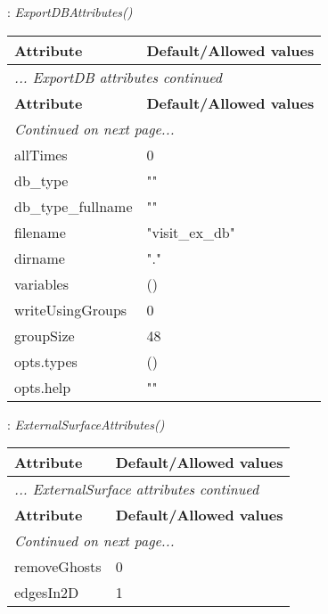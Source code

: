 \documentclass[10pt,a4paper]{report}
\begin{document}
\newpage

{}
: {\it ExportDBAttributes() }\\[-3mm]

\begin{longtable}{ll}
{\bf Attribute} & {\bf Default/Allowed values} \\
\hline \hline
\endfirsthead
\multicolumn{2}{l}{{\it ... ExportDB attributes continued}} \\
{\bf Attribute} & {\bf Default/Allowed values} \\
\hline \hline
\endhead
\hline
\multicolumn{2}{l}{{\it Continued on next page...}} \\
\endfoot
\hline
\endlastfoot

allTimes  &  0 \\
db\_type  &  "" \\
db\_type\_fullname  &  "" \\
filename  &  "visit\_ex\_db" \\
dirname  &  "." \\
variables  &  () \\
writeUsingGroups  &  0 \\
groupSize  &  48 \\
opts.types  &  () \\
opts.help  &  "" \\
\end{longtable}

\newpage

{}
: {\it ExternalSurfaceAttributes() }\\[-3mm]

\begin{longtable}{ll}
{\bf Attribute} & {\bf Default/Allowed values} \\
\hline \hline
\endfirsthead
\multicolumn{2}{l}{{\it ... ExternalSurface attributes continued}} \\
{\bf Attribute} & {\bf Default/Allowed values} \\
\hline \hline
\endhead
\hline
\multicolumn{2}{l}{{\it Continued on next page...}} \\
\endfoot
\hline
\endlastfoot

removeGhosts  &  0 \\
edgesIn2D  &  1 \\
\end{longtable}
\end{document}
